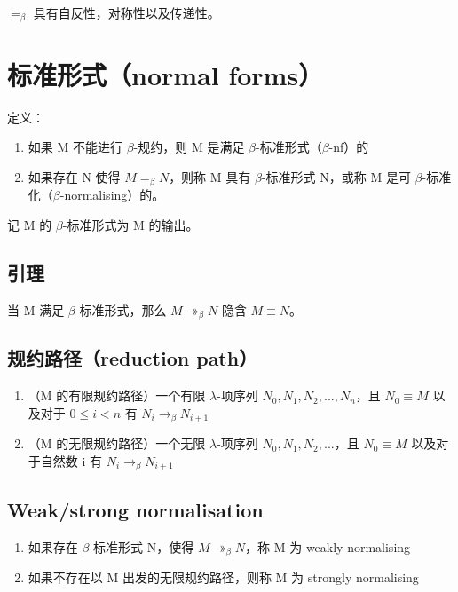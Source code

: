 \documentclass[UTF8]{article}
\begin{document}
	$=_\beta$ 具有自反性，对称性以及传递性。

\section{标准形式（normal forms）}

	定义：
	\begin{enumerate}
		\item 如果 M 不能进行 $\beta$-规约，则 M 是满足 $\beta$-标准形式（$\beta$-nf）的
		\item 如果存在 N 使得 $M =_\beta N$，则称 M 具有 $\beta$-标准形式 N，或称 M 是可 $\beta$-标准化（$\beta$-normalising）的。
	\end{enumerate}

	记 M 的 $\beta$-标准形式为 M 的输出。

\subsection{引理}

	当 M 满足 $\beta$-标准形式，那么 $M \twoheadrightarrow_\beta N$ 隐含 $M \equiv N$。

\subsection{规约路径（reduction path）}

	\begin{enumerate}
		\item （M 的有限规约路径）一个有限 $\lambda$-项序列 $N_0, N_1, N_2, ..., N_n$，且 $N_0 \equiv M$ 以及对于 $0 \le i < n$ 有 $N_i \rightarrow_\beta N_{i+1}$
		\item （M 的无限规约路径）一个无限 $\lambda$-项序列 $N_0, N_1, N_2, ...$，且 $N_0 \equiv M$ 以及对于自然数 i 有 $N_i \rightarrow_\beta N_{i+1}$
	\end{enumerate}

\subsection{Weak/strong normalisation}

	\begin{enumerate}
		\item 如果存在 $\beta$-标准形式 N，使得 $M \twoheadrightarrow_\beta N$，称 M 为 weakly normalising
		\item 如果不存在以 M 出发的无限规约路径，则称 M 为 strongly normalising
	\end{enumerate}
\end{document}
